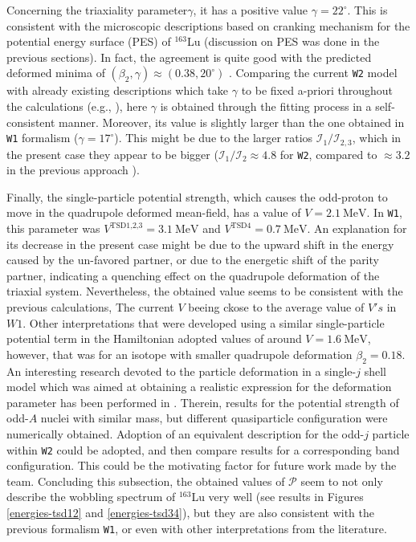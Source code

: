 \documentclass[11pt]{article}
\begin{document}
Concerning the triaxiality parameter$\gamma$, it has a positive value $\gamma=22^\circ$. This is consistent with the microscopic descriptions based on cranking mechanism for the potential energy surface (PES) of $^{163}$Lu (discussion on PES was done in the previous sections). In fact, the agreement is quite good with the predicted deformed minima of $(\beta_2,\gamma)\approx(0.38,20^\circ)$ \cite{jensen2002wobbling,jensen2004coexisting}. Comparing the current \texttt{W2} model with already existing descriptions which take $\gamma$ to be fixed a-priori throughout the calculations (e.g., \cite{tanabe2006algebraic,tanabe2017stability}), here $\gamma$ is obtained through the fitting process in a self-consistent manner. Moreover, its value is slightly larger than the one obtained in \texttt{W1} formalism ($\gamma=17^\circ$). This might be due to the larger ratios $\mathcal{I}_1/\mathcal{I}_{2,3}$, which in the present case they appear to be bigger ($\mathcal{I}_1/\mathcal{I}_{2}\approx4.8$ for \texttt{W2}, compared to $\approx3.2$ in the previous approach ).

Finally, the single-particle potential strength, which causes the odd-proton to move in the quadrupole deformed mean-field, has a value of $V=2.1\ \text{MeV}$. In \texttt{W1}, this parameter was $V^{\text{TSD1,2,3}}=3.1\ \text{MeV}$ and $V^\text{TSD4}=0.7\ \text{MeV}$. An explanation for its decrease in the present case might be due to the upward shift in the energy caused by the un-favored partner, or due to the energetic shift of the parity partner, indicating a quenching effect on the quadrupole deformation of the triaxial system. Nevertheless, the obtained value seems to be consistent with the previous calculations, The current $V$ beeing ckose to the average value of $V's$ in $W1$. Other interpretations \cite{tanabe2017stability} that were developed using a similar single-particle potential term in the Hamiltonian adopted values of around $V=1.6\ \text{MeV}$, however, that was for an isotope with smaller quadrupole deformation $\beta_2=0.18$. An interesting research devoted to the particle deformation in a single-$j$ shell model which was aimed at obtaining a realistic expression for the deformation parameter has been performed in \cite{shou2009coupling}. Therein, results for the potential strength of odd-$A$ nuclei with similar mass, but different quasiparticle configuration were numerically obtained. Adoption of an equivalent description for the odd-$j$ particle within \texttt{W2} could be adopted, and then compare results for a corresponding band configuration. This could be the motivating factor for future work made by the team. Concluding this subsection, the obtained values of $\mathcal{P}$ seem to not only describe the wobbling spectrum of $^{163}$Lu very well (see results in Figures \ref{energies-tsd12} and \ref{energies-tsd34}), but they are also consistent with the previous formalism \texttt{W1}, or even with other interpretations from the literature. 
\end{document}
